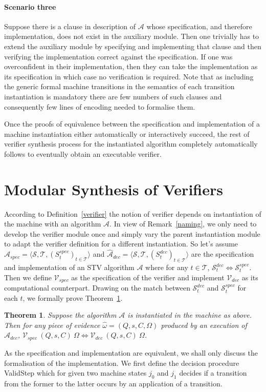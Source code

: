 \documentclass[10pt,conference]{IEEEtran}
\newtheorem{theorem}{Theorem}
\begin{document}
 \paragraph*{Scenario three} 
 Suppose there is a clause in description of $\mathcal{A}$ whose specification, and  therefore implementation,  does not exist in the auxiliary module. Then one trivially has to extend the auxiliary module by specifying and implementing that clause and then verifying the implementation correct against the specification.  If one was overconfident in their implementation, then they can take the implementation as its specification in which case  no verification is required.  Note that as including the generic formal machine transitions in the semantics of each transition instantiation is mandatory  
 there are few  numbers of such clauses and consequently few lines of encoding needed to formalise them. 
 
 Once the proofs of equivalence between the specification and implementation of a machine instantiation either automatically or interactively succeed, the rest of verifier synthesis process for the instantiated algorithm completely automatically follows to eventually obtain an executable verifier. 
\section{Modular Synthesis of Verifiers}\label{sec:Syn}

According to Definition~\ref{verifier} the notion of verifier depends on instantiation of the machine with an algorithm $\mathcal{A}$. In view of Remark~\ref{naming}, we only need to develop the verifier module once and simply vary the parent instantiation module to adapt the verifier definition for a different instantiation. So let's assume $\hat{\mathcal{A}}_{spec}=\langle \mathcal{S}, \mathcal{T}, (S_{t}^{spec})_{t \in \mathcal{T}} \rangle$ and $\hat{\mathcal{A}}_{dec}= \langle \mathcal{S}, \mathcal{T}, (S_{t}^{dec})_{t \in \mathcal{T}} \rangle$ are the specification and implementation of an STV algorithm $\mathcal{A}$ where for any $t\in\mathcal{T}$, $\mathcal{S}_{t}^{dec}\Leftrightarrow\mathcal{S}_{t}^{spec}$. 
 Then we define $\mathcal{V}_{spec}$ as the specification of the verifier  and implement $\mathcal{V}_{dec}$ as its  computational counterpart. Drawing on 
 the match between $\mathcal{S}_{t}^{dec}$ and $\mathcal{S}_{t}^{spec}$ for each $t$, we formally prove Theorem~\ref{EqVerifier}.
\begin{theorem}\label{EqVerifier} 
 Suppose the algorithm $\mathcal{A}$ is instantiated in the machine as above. Then for any piece of evidence $\hat{\omega}= (Q,s,C,\Omega)$ produced by an execution of $\mathcal{A}_{dec}$, $\mathcal{V}_{spec}~(Q,s,C)~ \Omega\Leftrightarrow\mathcal{V}_{dec}~(Q,s,C)~\Omega$.    
\end{theorem}
As the specification and implementation are equivalent, we shall only discuss the formalisation of the implementation. We first define the decision procedure Valid\textunderscore{}Step which for given two machine states $j_{0}$ and $j_{1}$ decides if a transition from the former to the latter occurs by an application of a transition.
\end{document}
